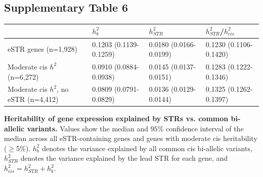 \pagebreak
\subsection{Supplementary Table 6}
\label{tab:estrsuptab6}
\begin{table}[h!]
\begin{adjustbox}{width=1\textwidth}
\begin{tabular}{l|l|l|l}
 & $h^2_b$ & $h^2_{STR}$ & $h^2_{STR}$/$h^2_{cis}$ \\
\hline
eSTR genes (n=1,928)         &	0.1203 (0.1139-0.1259) &	0.0180 (0.0166-0.0199)	& 0.1230 (0.1106-0.1420)\\\hline
Moderate cis $h^2$ (n=6,272) &	0.0910 (0.0884-0.0938) &	0.0145 (0.0137-0.0151)	& 0.1283 (0.1222-0.1346)\\\hline
Moderate cis $h^2$, no eSTR (n=4,412) & 0.0809 (0.0791-0.0829) & 0.0136 (0.0129-0.0144) & 0.1325 (0.1262-0.1397) \\\hline
\end{tabular}
\end{adjustbox}
\end{table}
\textbf{Heritability of gene expression explained by STRs vs. common bi-allelic variants.} Values show the median and $95\%$ confidence interval of the median across all eSTR-containing genes and genes with moderate cis heritability ($\geq$5\%). $h^2_b$ denotes the variance explained by all common cis bi-allelic variants, $h^2_{STR}$ denotes the variance explained by the lead STR for each gene, and $h^2_{cis} = h^2_{STR} + h^2_b$.

\pagebreak
